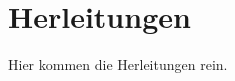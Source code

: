 \chapter[Herleitungen]{Herleitungen}%
\label{chap:AppendixDerivations}
%
Hier kommen die Herleitungen rein.